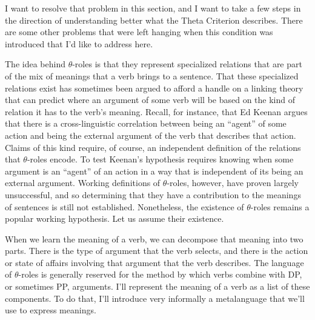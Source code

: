 I want to resolve that problem in this section, and I want to take a few steps in the direction of understanding better what the Theta Criterion describes. There are some other problems that were left hanging when this condition was introduced that I'd like to address here.

The idea behind $\theta$-roles is that they represent specialized relations that are part of the mix of meanings that a verb brings to a sentence. That these specialized relations exist has sometimes been argued to afford a handle on a linking theory that can predict where an argument of some verb will be based on the kind of relation it has to the verb's meaning. Recall, for instance, that Ed Keenan argues that there is a cross-linguistic correlation between being an ``agent'' of some action and being the external argument of the verb that describes that action. Claims of this kind require, of course, an independent definition of the relations that $\theta$-roles encode. To test Keenan's hypothesis requires knowing when some argument is an ``agent'' of an action in a way that is independent of its being an external argument. Working definitions of $\theta$-roles, however, have proven largely unsuccessful, and so determining that they have a contribution to the meanings of sentences is still not established. Nonetheless, the existence of $\theta$-roles remains a popular working hypothesis. Let us assume their existence.

When we learn the meaning of a verb, we can decompose that meaning into two parts. There is the type of argument that the verb selects, and there is the action or state of affairs involving that argument that the verb describes. The language of $\theta$-roles is generally reserved for the method by which verbs combine with DP, or sometimes PP, arguments. I'll represent the meaning of a verb as a list of these components. To do that, I'll introduce very informally a metalanguage that we'll use to express meanings.

